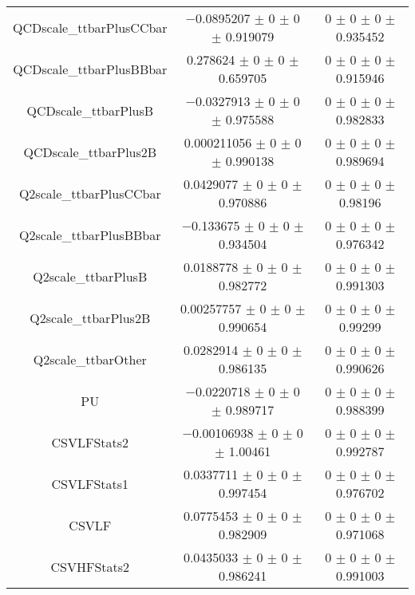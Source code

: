 \begin{table}
\begin{tabular}{ccc}
QCDscale\_ttbarPlusCCbar & \num{-0.0895207} $\pm$ \num{0} $\pm$ \num{0} $\pm$ \num{0.919079} & \num{0} $\pm$ \num{0} $\pm$ \num{0} $\pm$ \num{0.935452}\\
QCDscale\_ttbarPlusBBbar & \num{0.278624} $\pm$ \num{0} $\pm$ \num{0} $\pm$ \num{0.659705} & \num{0} $\pm$ \num{0} $\pm$ \num{0} $\pm$ \num{0.915946}\\
QCDscale\_ttbarPlusB & \num{-0.0327913} $\pm$ \num{0} $\pm$ \num{0} $\pm$ \num{0.975588} & \num{0} $\pm$ \num{0} $\pm$ \num{0} $\pm$ \num{0.982833}\\
QCDscale\_ttbarPlus2B & \num{0.000211056} $\pm$ \num{0} $\pm$ \num{0} $\pm$ \num{0.990138} & \num{0} $\pm$ \num{0} $\pm$ \num{0} $\pm$ \num{0.989694}\\
Q2scale\_ttbarPlusCCbar & \num{0.0429077} $\pm$ \num{0} $\pm$ \num{0} $\pm$ \num{0.970886} & \num{0} $\pm$ \num{0} $\pm$ \num{0} $\pm$ \num{0.98196}\\
Q2scale\_ttbarPlusBBbar & \num{-0.133675} $\pm$ \num{0} $\pm$ \num{0} $\pm$ \num{0.934504} & \num{0} $\pm$ \num{0} $\pm$ \num{0} $\pm$ \num{0.976342}\\
Q2scale\_ttbarPlusB & \num{0.0188778} $\pm$ \num{0} $\pm$ \num{0} $\pm$ \num{0.982772} & \num{0} $\pm$ \num{0} $\pm$ \num{0} $\pm$ \num{0.991303}\\
Q2scale\_ttbarPlus2B & \num{0.00257757} $\pm$ \num{0} $\pm$ \num{0} $\pm$ \num{0.990654} & \num{0} $\pm$ \num{0} $\pm$ \num{0} $\pm$ \num{0.99299}\\
Q2scale\_ttbarOther & \num{0.0282914} $\pm$ \num{0} $\pm$ \num{0} $\pm$ \num{0.986135} & \num{0} $\pm$ \num{0} $\pm$ \num{0} $\pm$ \num{0.990626}\\
PU & \num{-0.0220718} $\pm$ \num{0} $\pm$ \num{0} $\pm$ \num{0.989717} & \num{0} $\pm$ \num{0} $\pm$ \num{0} $\pm$ \num{0.988399}\\
CSVLFStats2 & \num{-0.00106938} $\pm$ \num{0} $\pm$ \num{0} $\pm$ \num{1.00461} & \num{0} $\pm$ \num{0} $\pm$ \num{0} $\pm$ \num{0.992787}\\
CSVLFStats1 & \num{0.0337711} $\pm$ \num{0} $\pm$ \num{0} $\pm$ \num{0.997454} & \num{0} $\pm$ \num{0} $\pm$ \num{0} $\pm$ \num{0.976702}\\
CSVLF & \num{0.0775453} $\pm$ \num{0} $\pm$ \num{0} $\pm$ \num{0.982909} & \num{0} $\pm$ \num{0} $\pm$ \num{0} $\pm$ \num{0.971068}\\
CSVHFStats2 & \num{0.0435033} $\pm$ \num{0} $\pm$ \num{0} $\pm$ \num{0.986241} & \num{0} $\pm$ \num{0} $\pm$ \num{0} $\pm$ \num{0.991003}\\

\end{tabular}
\end{table}
